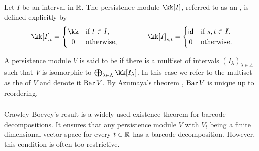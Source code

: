 
\subsubsection{}

Let $I$ be an interval in $\mathbb{R}$.
The persistence module $\kk[I]$, referred to as an , is defined explicitly by
\[
\kk[I]_t =
\begin{cases}
	\kk & \text{if } t \in I, \\
	\hfil 0 & \text{otherwise},
\end{cases}
\qquad \qquad
\kk[I]_{s, t} =
\begin{cases}
	\id & \text{if } s, t \in I, \\
	\hfil 0 & \text{otherwise}.
\end{cases}
\]

A persistence module $V$ is said to be  if there is a multiset of intervals $(I_\lambda)_{\lambda \in \Lambda}$ such that $V$ is isomorphic to $\bigoplus_{\lambda \in \Lambda} \kk[I_\lambda]$.
In this case we refer to the multiset as the  of $V$ and denote it $\operatorname{Bar} V$.
By Azumaya’s theorem \cite{azumaya1950theorem}, $\operatorname{Bar} V$ is unique up to reordering.

\subsubsection{}

Crawley-Boevey's result \cite{Crawley-Boevey.2015} is a widely used existence theorem for barcode decompositions.
It ensures that any persistence module \(V\) with \(V_t\) being a finite dimensional vector space for every \(t \in \mathbb{R}\) has a barcode decomposition.
However, this condition is often too restrictive.

